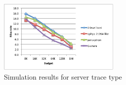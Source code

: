 \documentclass[conference]{IEEEtran}
\begin{document}
\begin{figure}[!t]
    \centering
    \includegraphics[width=2.3in]{SERVER}
    \caption{Simulation results for server trace type}
    \label{figa6}
\end{figure}


%
%



%
%
\end{document}
